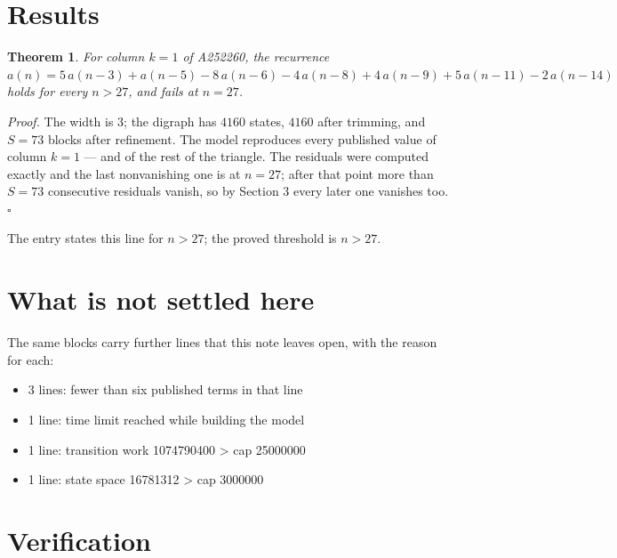 \documentclass[11pt]{article}
\newtheorem{theorem}{Theorem}
\theoremstyle{definition}
\begin{document}
\section{Results}

\begin{theorem} For column $k = 1$ of A252260, the recurrence $a(n) = 5\,a(n-3) + a(n-5) - 8\,a(n-6) - 4\,a(n-8) + 4\,a(n-9) + 5\,a(n-11) - 2\,a(n-14)$ holds for every $n > 27$, and fails at $n = 27$.\end{theorem}

{\itshape Proof.} The width is $3$; the digraph has $4160$ states, $4160$ after trimming, and $S = 73$ blocks after refinement. The model reproduces every published value of column $k = 1$ --- and of the rest of the triangle. The residuals were computed exactly and the last nonvanishing one is at $n = 27$; after that point more than $S = 73$ consecutive residuals vanish, so by Section 3 every later one vanishes too. $\square$

The entry states this line for $n > 27$; the proved threshold is $n > 27$.

\section{What is not settled here}

The same blocks carry further lines that this note leaves open, with the reason for each:

\begin{itemize}

\item 3 lines: fewer than six published terms in that line

\item 1 line: time limit reached while building the model

\item 1 line: transition work 1074790400 > cap 25000000

\item 1 line: state space 16781312 > cap 3000000

\end{itemize}

\section{Verification}
\end{document}
